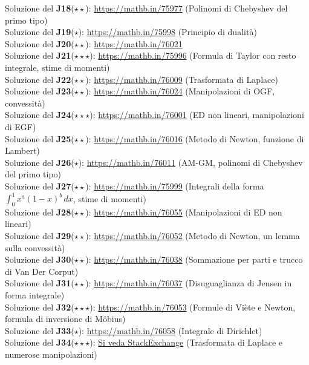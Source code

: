 \documentclass[a4paper,twoside]{article}
\theoremstyle{definition}
\numberwithin{theorem}{section}
\begin{document}
Soluzione del \textbf{J18}($\star\star$): \url{https://mathb.in/75977} (Polinomi di Chebyshev del primo tipo)\\
Soluzione del \textbf{J19}($\star$): \url{https://mathb.in/75998} (Principio di dualità) \\
Soluzione del \textbf{J20}($\star\star$): \url{https://mathb.in/76021} \\
Soluzione del \textbf{J21}($\star\star\star$): \url{https://mathb.in/75996} (Formula di Taylor con resto integrale, stime di momenti)\\
Soluzione del \textbf{J22}($\star\star$): \url{https://mathb.in/76009} (Trasformata di Laplace)\\
Soluzione del \textbf{J23}($\star\star$): \url{https://mathb.in/76024} (Manipolazioni di OGF, convessità)\\
Soluzione del \textbf{J24}($\star\star\star$): \url{https://mathb.in/76001} (ED non lineari, manipolazioni di EGF) \\
Soluzione del \textbf{J25}($\star\star$): \url{https://mathb.in/76016} (Metodo di Newton, funzione di Lambert)\\
Soluzione del \textbf{J26}($\star$): \url{https://mathb.in/76011} (AM-GM, polinomi di Chebyshev del primo tipo) \\
Soluzione del \textbf{J27}($\star\star$): \url{https://mathb.in/75999} (Integrali della forma $\int_{0}^{1}x^a(1-x)^b\,dx$, stime di momenti)\\
Soluzione del \textbf{J28}($\star\star$): \url{https://mathb.in/76055} (Manipolazioni di ED non lineari) \\
Soluzione del \textbf{J29}($\star\star$): \url{https://mathb.in/76052} (Metodo di Newton, un lemma sulla convessità)\\
Soluzione del \textbf{J30}($\star\star$): \url{https://mathb.in/76038} (Sommazione per parti e trucco di Van Der Corput)\\
Soluzione del \textbf{J31}($\star\star$): \url{https://mathb.in/76037} (Disuguaglianza di Jensen in forma integrale)\\
Soluzione del \textbf{J32}($\star\star\star$): \url{https://mathb.in/76053} (Formule di Viète e Newton, formula di inversione di M\"obius)  \\
Soluzione del \textbf{J33}($\star$): \url{https://mathb.in/76058} (Integrale di Dirichlet)\\
Soluzione del \textbf{J34}($\star\star\star$): \href{https://math.stackexchange.com/questions/2442091/a-ramanujan-sum/2442175#2442175}{Si veda StackExchange} (Trasformata di Laplace e numerose manipolazioni)\\
\end{document}
